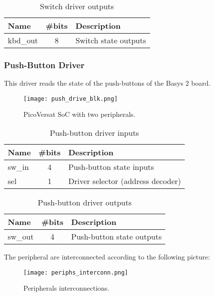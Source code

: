 \begin{table}[ht]
    \centering
    \caption{Switch driver outputs}
    \label{tab:swOut}
    \begin{tabular}{@{}lll@{}}
    \toprule
    Name     & \#bits                & Description          \\ \midrule
    kbd\_out & \multicolumn{1}{c}{8} & Switch state outputs \\ \bottomrule
    \end{tabular}
    \end{table}



\subsubsection{Push-Button Driver}

This driver reads the state of the push-buttons of the Basys 2 board.



\begin{figure}[!htbp]
    \centerline{\texttt{[image: push\_drive\_blk.png]}}
    \vspace{0cm}\caption{PicoVersat SoC with two peripherals.}
    \label{fig:periphs}
\end{figure}

\begin{table}[!htbp]
    \centering
    \caption{Push-button driver inputs}
    \label{tab:pshIn}
    \begin{tabular}{@{}lcl@{}}
    \toprule
    Name   & \multicolumn{1}{l}{\#bits} & Description                       \\ \midrule
    sw\_in & 4                          & Push-button state inputs              \\
    sel    & 1                          & Driver selector (address decoder) \\ \bottomrule
    \end{tabular}
    \end{table}

\begin{table}[!htbp]
    \centering
    \caption{Push-button driver outputs}
    \label{tab:pshOut}
    \begin{tabular}{@{}lll@{}}
    \toprule
    Name    & \#bits                & Description               \\ \midrule
    sw\_out & \multicolumn{1}{c}{4} & Push-button state outputs \\ \bottomrule
    \end{tabular}
    \end{table}

The peripheral are interconnected according to the following picture:

\begin{figure}[!htbp]
    \centerline{\texttt{[image: periphs\_interconn.png]}}
    \vspace{0cm}\caption{Peripherals interconnections.}
    \label{fig:periphs}
\end{figure}
